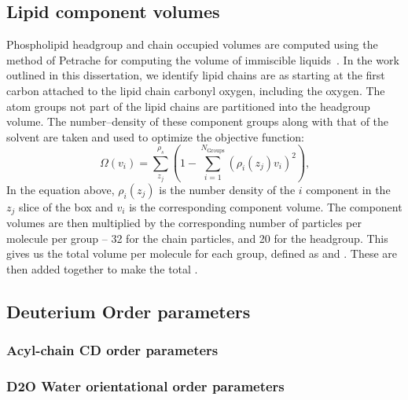 \subsection{Lipid component volumes}
Phospholipid headgroup and chain occupied volumes are computed using the method of Petrache \etal{} for computing the
volume of immiscible liquids~\cite{petrache:1997}.
In the work outlined in this dissertation, we identify lipid chains are as starting 
at the first carbon attached to the lipid chain carbonyl oxygen, including the oxygen.
The atom groups not part of the lipid
chains are partitioned into the headgroup volume. 
The number--density of these component groups along with that of the solvent are taken 
and used to optimize the objective function:
\begin{equation}
    \label{eq:volumeobj}
    \Omega(v_i)=\sum^{\rho_s}_{z_j}(1-\sum^{N_{\text{Groups}}}_{i=1}{(\rho_i(z_j)v_i)^2})\text{,}
\end{equation}
In the equation above, $\rho_i(z_j)$ is the number density of the $i$ component in the
$z_j$ slice of the box and $v_i$ is the corresponding component volume. 
The component volumes are then multiplied by the corresponding
number of particles per molecule per group -- 32 for the chain
particles, and 20 for the headgroup. 
This gives us the total volume per molecule for each group, defined as \Vh{} and \Vc{}. These are then
added together to make the total \Vl{}.
\subsection{Deuterium Order parameters}
\subsubsection{Acyl-chain CD order parameters}

\subsubsection{D2O Water orientational order parameters}

